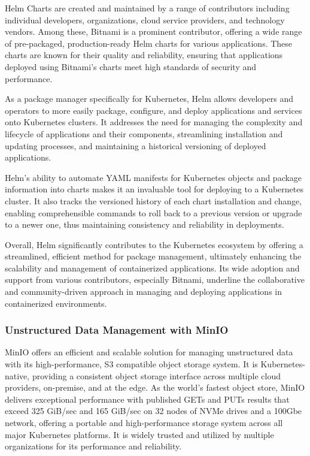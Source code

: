 \documentclass{article}
\begin{document}
    Helm Charts are created and maintained by a range of contributors including individual developers, organizations, cloud service providers, and technology vendors. Among these, Bitnami is a prominent contributor, offering a wide range of pre-packaged, production-ready Helm charts for various applications. These charts are known for their quality and reliability, ensuring that applications deployed using Bitnami’s charts meet high standards of security and performance.

    As a package manager specifically for Kubernetes, Helm allows developers and operators to more easily package, configure, and deploy applications and services onto Kubernetes clusters. It addresses the need for managing the complexity and lifecycle of applications and their components, streamlining installation and updating processes, and maintaining a historical versioning of deployed applications.

    Helm's ability to automate YAML manifests for Kubernetes objects and package information into charts makes it an invaluable tool for deploying to a Kubernetes cluster. It also tracks the versioned history of each chart installation and change, enabling comprehensible commands to roll back to a previous version or upgrade to a newer one, thus maintaining consistency and reliability in deployments.

    Overall, Helm significantly contributes to the Kubernetes ecosystem by offering a streamlined, efficient method for package management, ultimately enhancing the scalability and management of containerized applications. Its wide adoption and support from various contributors, especially Bitnami, underline the collaborative and community-driven approach in managing and deploying applications in containerized environments.

    \subsubsection{Unstructured Data Management with MinIO}
    MinIO offers an efficient and scalable solution for managing unstructured data with its high-performance, S3 compatible object storage system. It is Kubernetes-native, providing a consistent object storage interface across multiple cloud providers, on-premise, and at the edge. As the world's fastest object store, MinIO delivers exceptional performance with published GETs and PUTs results that exceed 325 GiB/sec and 165 GiB/sec on 32 nodes of NVMe drives and a 100Gbe network, offering a portable and high-performance storage system across all major Kubernetes platforms. It is widely trusted and utilized by multiple organizations for its performance and reliability.
\end{document}
